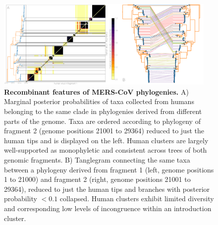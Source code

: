 \documentclass[9pt,lineno]{elife}
\begin{document}
\begin{figure}%
    \centering
    \includegraphics[width=0.95\textwidth]{figures/figure 4.png}
    \caption{\textbf{Recombinant features of MERS-CoV phylogenies.}
    A) Marginal posterior probabilities of taxa collected from humans belonging to the same clade in phylogenies derived from different parts of the genome.
    Taxa are ordered according to phylogeny of fragment 2 (genome positions 21001 to 29364) reduced to just the human tips and is displayed on the left.
    Human clusters are largely well-supported as monophyletic and consistent across trees of both genomic fragments.
    B) Tanglegram connecting the same taxa between a phylogeny derived from fragment 1 (left, genome positions 1 to 21000) and fragment 2 (right, genome positions 21001 to 29364), reduced to just the human tips and branches with posterior probability $<0.1$ collapsed.
    Human clusters exhibit limited diversity and corresponding low levels of incongruence within an introduction cluster.
    }
    \label{recombinant_features}



\end{figure}
\end{document}
